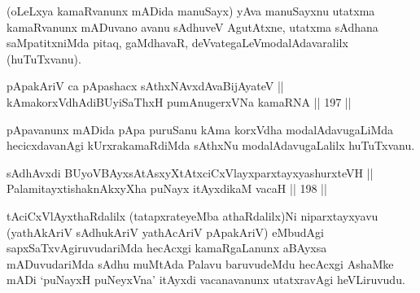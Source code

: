\begin{artha}
(oLeLxya kamaRvanunx mADida manuSayx) yAva manuSayxnu utatxma
kamaRvanunx mADuvano avanu sAdhuveV AgutAtxne, utatxma sAdhana
saMpatitxniMda pitaq, gaMdhavaR, deVvategaLeV\break modalAdavaralilx
(huTuTxvanu).
\end{artha}

\begin{shl}
pApakAriV ca pApashacx sAthxNAvxdAvaBijAyateV || \\
kAmakorxVdhAdiBUyiSaThxH pumAnugerxVNa kamaRNA \hfill || 197 ||  
\end{shl}

\begin{artha}
pApavanunx mADida pApa puruSanu kAma korxVdha modalAdavugaLiMda
hecicxdavanAgi kUrxrakamaRdiMda sAthxNu modalAdavugaLalilx huTuTxvanu.
\end{artha}



\begin{shl}
sAdhAvxdi BUyoVBAyxsAtAsxyXtAtxciCxVlayxparxtayxyashurxteVH || \\
PalamitayxtishaknAkxyX\s \s ha puNayx itAyxdikaM vacaH \hfill || 198 ||  
\end{shl}

\begin{artha}
tAciCxVlAyxthaRdalilx (tatapxrateyeMba athaRdalilx)Ni niparxtayxyavu
(yathAkAriV sAdhukAriV yathAcAriV pApakAriV) eMbudAgi
sapxSaTxvAgiruvudariMda hecAcxgi kamaRgaLanunx aBAyxsa mADuvudariMda
sAdhu muMtAda Palavu baruvudeMdu hecAcxgi AshaMke mADi `puNayxH
puNeyxVna' itAyxdi vacanavanunx utatxravAgi heVLiruvudu.
\end{artha}


